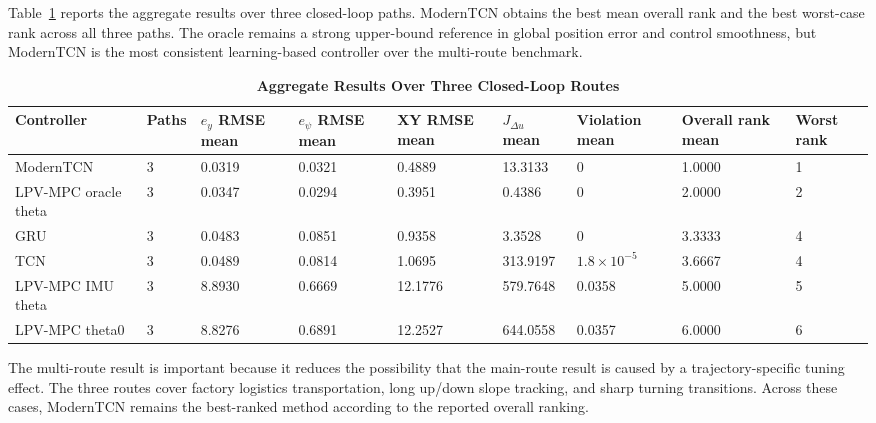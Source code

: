 \documentclass{ieeeaccess}
\begin{document}
Table~\ref{tab:multipath_aggregate} reports the aggregate results over three closed-loop paths. ModernTCN obtains the best mean overall rank and the best worst-case rank across all three paths. The oracle remains a strong upper-bound reference in global position error and control smoothness, but ModernTCN is the most consistent learning-based controller over the multi-route benchmark.

\begin{table}[!t]

\caption{\textbf{Aggregate Results Over Three Closed-Loop Routes}}

\label{tab:multipath_aggregate}

\setlength{\tabcolsep}{4pt}

\begin{tabular}{|p{105pt}|p{36pt}|p{50pt}|p{50pt}|p{50pt}|p{55pt}|p{48pt}|p{54pt}|p{54pt}|}

\hline

Controller & Paths & $e_y$ RMSE mean & $e_{\psi}$ RMSE mean & XY RMSE mean & $J_{\Delta u}$ mean & Violation mean & Overall rank mean & Worst rank \\

\hline

ModernTCN & 3 & 0.0319 & 0.0321 & 0.4889 & 13.3133 & 0 & 1.0000 & 1 \\

LPV-MPC oracle theta & 3 & 0.0347 & 0.0294 & 0.3951 & 0.4386 & 0 & 2.0000 & 2 \\

GRU & 3 & 0.0483 & 0.0851 & 0.9358 & 3.3528 & 0 & 3.3333 & 4 \\

TCN & 3 & 0.0489 & 0.0814 & 1.0695 & 313.9197 & $1.8\times10^{-5}$ & 3.6667 & 4 \\

LPV-MPC IMU theta & 3 & 8.8930 & 0.6669 & 12.1776 & 579.7648 & 0.0358 & 5.0000 & 5 \\

LPV-MPC theta0 & 3 & 8.8276 & 0.6891 & 12.2527 & 644.0558 & 0.0357 & 6.0000 & 6 \\

\hline

\end{tabular}

\end{table}

The multi-route result is important because it reduces the possibility that the main-route result is caused by a trajectory-specific tuning effect. The three routes cover factory logistics transportation, long up/down slope tracking, and sharp turning transitions. Across these cases, ModernTCN remains the best-ranked method according to the reported overall ranking.
\end{document}
